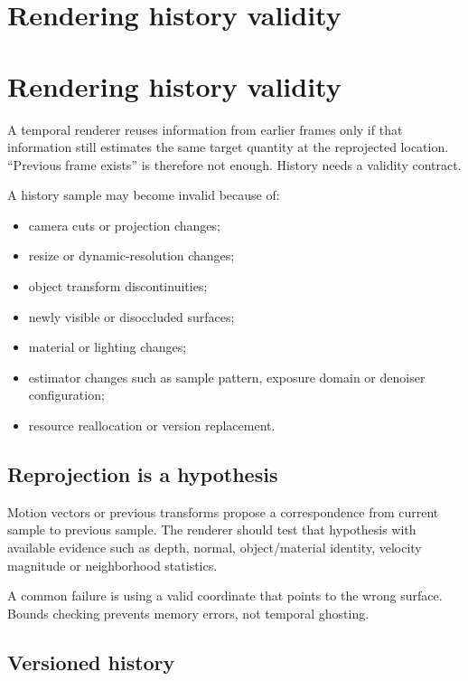 \hypertarget{appendix-2e7e9fd28a2c}{}
\section*{Rendering history validity}
\section{Rendering history validity}\label{rendering-history-validity}

A temporal renderer reuses information from earlier frames only if that information still estimates the same target quantity at the reprojected location. ``Previous frame exists'' is therefore not enough. History needs a validity contract.

A history sample may become invalid because of:

\begin{itemize}
\tightlist
\item
  camera cuts or projection changes;
\item
  resize or dynamic-resolution changes;
\item
  object transform discontinuities;
\item
  newly visible or disoccluded surfaces;
\item
  material or lighting changes;
\item
  estimator changes such as sample pattern, exposure domain or denoiser configuration;
\item
  resource reallocation or version replacement.
\end{itemize}

\subsection{Reprojection is a hypothesis}\label{reprojection-is-a-hypothesis}

Motion vectors or previous transforms propose a correspondence from current sample to previous sample. The renderer should test that hypothesis with available evidence such as depth, normal, object/material identity, velocity magnitude or neighborhood statistics.

A common failure is using a valid coordinate that points to the wrong surface. Bounds checking prevents memory errors, not temporal ghosting.

\subsection{Versioned history}\label{versioned-history}

